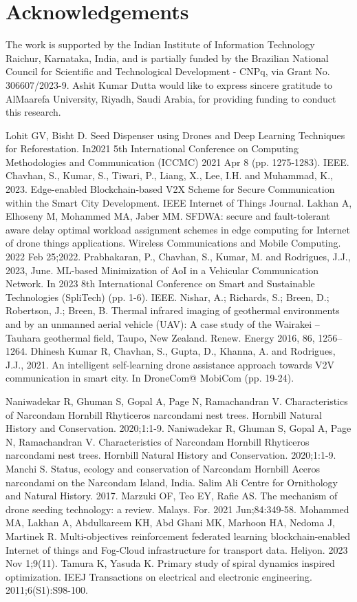 \documentclass[conference]{IEEEtran}
\begin{document}
\section*{Acknowledgements} The work is supported by the Indian Institute of Information Technology Raichur, Karnataka, India, and is partially funded by the Brazilian National Council for Scientific and Technological Development - CNPq, via Grant No. 306607/2023-9. Ashit Kumar Dutta would like to express sincere gratitude to AlMaarefa University, Riyadh, Saudi Arabia, for providing funding to conduct this research.
\begin{thebibliography}{1}
 Lohit GV, Bisht D. Seed Dispenser using Drones and Deep Learning Techniques for Reforestation. In2021 5th International Conference on Computing Methodologies and Communication (ICCMC) 2021 Apr 8 (pp. 1275-1283). IEEE.
 Chavhan, S., Kumar, S., Tiwari, P., Liang, X., Lee, I.H. and Muhammad, K., 2023. Edge-enabled Blockchain-based V2X Scheme for Secure Communication within the Smart City Development. IEEE Internet of Things Journal.
Lakhan A, Elhoseny M, Mohammed MA, Jaber MM. SFDWA: secure and fault-tolerant aware delay optimal workload assignment schemes in edge computing for Internet of drone things applications. Wireless Communications and Mobile Computing. 2022 Feb 25;2022.
 Prabhakaran, P., Chavhan, S., Kumar, M. and Rodrigues, J.J., 2023, June. ML-based Minimization of AoI in a Vehicular Communication Network. In 2023 8th International Conference on Smart and Sustainable Technologies (SpliTech) (pp. 1-6). IEEE.
 Nishar, A.; Richards, S.; Breen, D.; Robertson, J.; Breen, B. Thermal infrared imaging of geothermal environments and by an unmanned aerial vehicle (UAV): A case study of the Wairakei – Tauhara geothermal field, Taupo, New Zealand. Renew. Energy 2016, 86, 1256–1264.
 Dhinesh Kumar R, Chavhan, S., Gupta, D., Khanna, A. and Rodrigues, J.J., 2021. An intelligent self-learning drone assistance approach towards V2V communication in smart city. In DroneCom@ MobiCom (pp. 19-24).

 Naniwadekar R, Ghuman S, Gopal A, Page N, Ramachandran V. Characteristics of Narcondam Hornbill Rhyticeros narcondami nest trees. Hornbill Natural History and Conservation. 2020;1:1-9.
Naniwadekar R, Ghuman S, Gopal A, Page N, Ramachandran V. Characteristics of Narcondam Hornbill Rhyticeros narcondami nest trees. Hornbill Natural History and Conservation. 2020;1:1-9.
Manchi S. Status, ecology and conservation of Narcondam Hornbill Aceros narcondami on the Narcondam Island, India. Salim Ali Centre for Ornithology and Natural History. 2017.
Marzuki OF, Teo EY, Rafie AS. The mechanism of drone seeding technology: a review. Malays. For. 2021 Jun;84:349-58.
Mohammed MA, Lakhan A, Abdulkareem KH, Abd Ghani MK, Marhoon HA, Nedoma J, Martinek R. Multi-objectives reinforcement federated learning blockchain-enabled Internet of things and Fog-Cloud infrastructure for transport data. Heliyon. 2023 Nov 1;9(11).
 Tamura K, Yasuda K. Primary study of spiral dynamics inspired optimization. IEEJ Transactions on electrical and electronic engineering. 2011;6(S1):S98-100.


\end{thebibliography}
\end{document}
